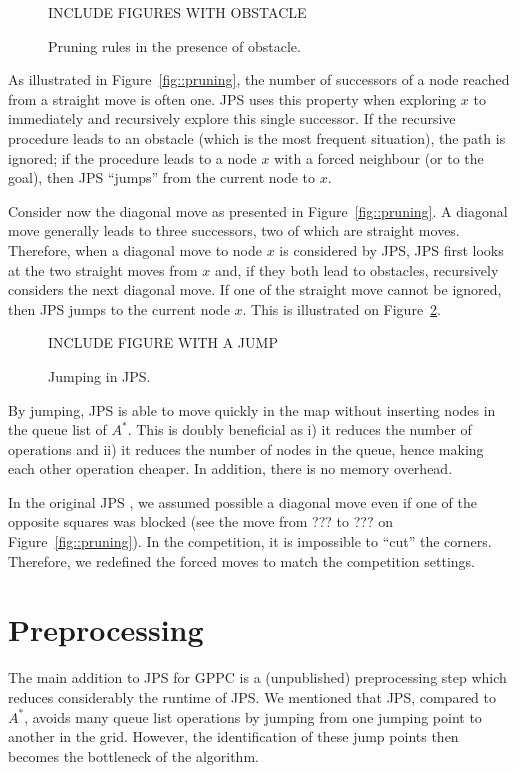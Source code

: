 \documentclass{article}
\begin{document}
\begin{figure}[ht]
  INCLUDE FIGURES WITH OBSTACLE
  \caption{Pruning rules in the presence of obstacle.}
  \label{fig::forced}
\end{figure}

As illustrated in Figure~\ref{fig::pruning}, 
the number of successors of a node reached from a straight move 
is often one.  
JPS uses this property when exploring $x$ 
to immediately and recursively explore this single successor.  
If the recursive procedure leads to an obstacle (which is the most frequent situation), 
the path is ignored; 
if the procedure leads to a node $x$ with a forced neighbour 
(or to the goal), then JPS ``jumps'' from the current node to $x$.  

Consider now the diagonal move as presented in Figure~\ref{fig::pruning}.  
A diagonal move generally leads to three successors, 
two of which are straight moves.  
Therefore, when a diagonal move to node $x$ is considered by JPS, 
JPS first looks at the two straight moves from $x$ 
and, if they both lead to obstacles, recursively considers the next diagonal move.  
If one of the straight move cannot be ignored, 
then JPS jumps to the current node $x$.  
This is illustrated on Figure~\ref{fig::jump}.  

\begin{figure}[ht]
  INCLUDE FIGURE WITH A JUMP
  \caption{Jumping in JPS.}
  \label{fig::jump}
\end{figure}

By jumping, JPS is able to move quickly in the map 
without inserting nodes in the queue list of $A^*$.  
This is doubly beneficial as i) it reduces the number of operations 
and ii) it reduces the number of nodes in the queue, 
hence making each other operation cheaper.  
In addition, there is no memory overhead.  

In the original JPS \cite{harabor11b}, 
we assumed possible a diagonal move
even if one of the opposite squares was blocked 
(see the move from ??? to ??? on Figure~\ref{fig::pruning}).  
In the competition, it is impossible to ``cut'' the corners.  
Therefore, we redefined the forced moves to match the competition settings.  

\section{Preprocessing}
\label{sec::pre}

The main addition to JPS for GPPC is a (unpublished) preprocessing step 
which reduces considerably the runtime of JPS.  
We mentioned that JPS, compared to $A^*$, 
avoids many queue list operations 
by jumping from one jumping point to another in the grid.  
However, the identification of these jump points 
then becomes the bottleneck of the algorithm.  
\end{document}
